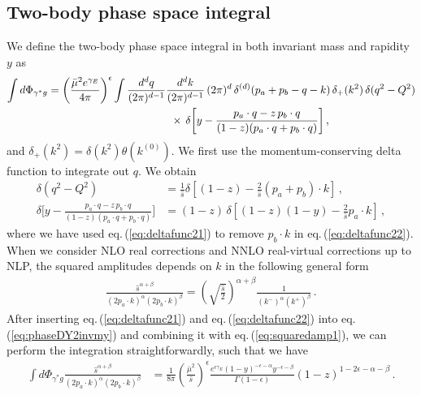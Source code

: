 \documentclass[11pt]{article}
\newcommand{\eps}{\epsilon}
\newcommand{\s}{\hat{s}}
\newcommand\eqn[1]     {eq.\,(\ref{#1})}
\begin{document}
\subsection{Two-body phase space integral}
\label{2PhaseSpace-DY}

We define the two-body phase space integral in both invariant
mass and rapidity $y$ as
%
\begin{align}\label{eq:phaseDY2invmy}
    \int d \Phi_{\gamma^*g} &= \bigg(\frac{\bar \mu^2 e^{\gamma_E}}{4\pi}\bigg)^\eps\int \frac{d^dq}{(2\pi)^{d-1}} \frac{d^d k}{(2\pi)^{d-1}}
\,(2\pi)^d\, \delta^{(d)}(p_a + p_b - q - k) \, \delta_+(k^2) \, \delta(q^2 - Q^2) \nonumber \\
&\hspace{4.0cm}\times \, \delta\bigg[y - \frac{p_a \cdot q - z \, p_b \cdot q}{(1-z)
(p_a \cdot q + p_b \cdot q)} \bigg]\,,
\end{align}
and $\delta_+\left(k^2\right) = 
\delta\left(k^2\right) \theta\left(k^{(0)}\right)$. We first use the momentum-conserving delta function to integrate out $q$. We obtain
%
\begin{align}
    \delta(q^2 - Q^2) 
    &= \frac{1}{\hat{s}}\delta\left[(1-z)-\frac{2}{\hat{s}}(p_a+p_b)\cdot k \right]\,, \label{eq:deltafunc21} \\
    \delta\bigg[y - \frac{p_a \cdot q - z \, p_b \cdot q}{(1-z) (p_a \cdot q + p_b \cdot q)} \bigg] 
    &= (1-z) \, \delta\left[(1-z)(1-y)-\frac{2}{\hat{s}}p_a\cdot k\right]\,,\label{eq:deltafunc22}
\end{align}
%
where we have used \eqn{eq:deltafunc21} to remove $p_b\cdot k$ in \eqn{eq:deltafunc22}.
When we consider NLO real corrections and NNLO real-virtual corrections up to NLP, the squared amplitudes depends on $k$ in the following general form 
%
\begin{align}\label{eq:squaredamp1}
   \frac{\hat{s}^{\alpha+\beta}}{(2p_a\cdot k)^{\alpha}(2p_b\cdot k)^{\beta}} = \left(\sqrt{\frac{\hat{s}}{2}}\right)^{\alpha+\beta}\frac{1}{(k^-)^{\alpha}(k^+)^{\beta}} \,.
\end{align}
After inserting \eqn{eq:deltafunc21} and \eqn{eq:deltafunc22} into \eqn{eq:phaseDY2invmy} and combining it with \eqn{eq:squaredamp1}, we can perform the integration straightforwardly, such that we have 
%
\begin{align}\label{eq:phaseDY2invmyr}
    \int d \Phi_{\gamma^*g}\frac{\hat{s}^{\alpha+\beta}}{(2p_a\cdot k)^{\alpha}(2p_b\cdot k)^{\beta}} &=\frac{1}{8\pi}\left(\frac{\bar\mu^2}{\s}\right)^\epsilon\frac{e^{\eps\gamma_E}(1-y)^{-\epsilon-\alpha}y^{-\epsilon-\beta}}{\Gamma(1-\epsilon)}\left(1-z\right)^{1-2\epsilon-\alpha-\beta} \,.
\end{align}
%
\end{document}
